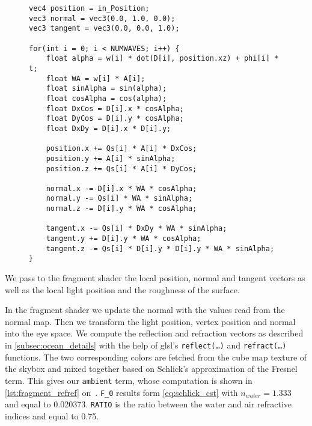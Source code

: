 \begin{figure}[ht!]
\begin{lstlisting}
vec4 position = in_Position;
vec3 normal = vec3(0.0, 1.0, 0.0);
vec3 tangent = vec3(0.0, 0.0, 1.0);

for(int i = 0; i < NUMWAVES; i++) {
    float alpha = w[i] * dot(D[i], position.xz) + phi[i] * t;
    float WA = w[i] * A[i];
    float sinAlpha = sin(alpha);
    float cosAlpha = cos(alpha);
    float DxCos = D[i].x * cosAlpha;
    float DyCos = D[i].y * cosAlpha;
    float DxDy = D[i].x * D[i].y;

    position.x += Qs[i] * A[i] * DxCos;
    position.y += A[i] * sinAlpha;
    position.z += Qs[i] * A[i] * DyCos;

    normal.x -= D[i].x * WA * cosAlpha;
    normal.y -= Qs[i] * WA * sinAlpha;
    normal.z -= D[i].y * WA * cosAlpha;

    tangent.x -= Qs[i] * DxDy * WA * sinAlpha;
    tangent.y += D[i].y * WA * cosAlpha;
    tangent.z -= Qs[i] * D[i].y * D[i].y * WA * sinAlpha;
}
\end{lstlisting}
\end{figure}

We pass to the fragment shader the local position, normal and tangent vectors 
as well as the local light position and the roughness of the surface.

In the fragment shader we update the normal with the values read from the normal
map. Then we transform the light position, vertex position and normal into the
eye space. We compute the reflection and refraction vectors as described in
\autoref{subsec:ocean_details} with the help of glsl's \texttt{reflect(\ldots)}
and \texttt{refract(\ldots)} functions. The two corresponding colors are fetched
from the cube map texture of the skybox and mixed together based on Schlick's
approximation of the Fresnel term. This gives our \texttt{ambient} term, whose
computation is shown in \autoref{lst:fragment_refref}
on~\pageref{lst:fragment_refref}. \texttt{F\_0} results form
\autoref{eq:schlick_cst} with $n_{water} = 1.333$ and equal to 0.020373.
\texttt{RATIO} is the ratio between the water and air refractive indices and
equal to 0.75.


